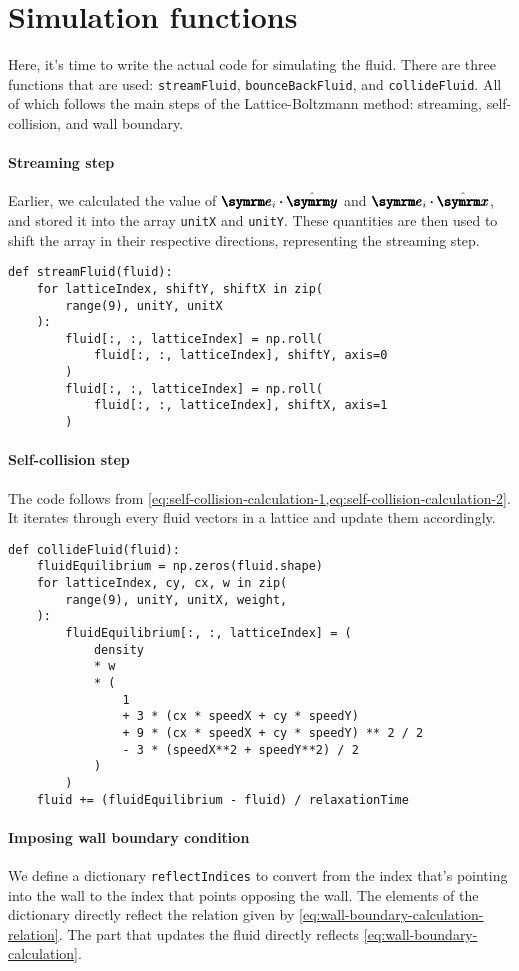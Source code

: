 \section{Simulation functions}
\label{sec:simulation-function}

Here, it's time to write the actual code for simulating the fluid. There are three functions that are used: \texttt{streamFluid}, \texttt{bounceBackFluid}, and \texttt{collideFluid}. All of which follows the main steps of the Lattice-Boltzmann method: streaming, self-collision, and wall boundary.

\paragraph{Streaming step} Earlier, we calculated the value of $\vv{e}_i\vdot\yhat$ and $\vv{e}_i\vdot\xhat$, and stored it into the array \texttt{unitX} and \texttt{unitY}. These quantities are then used to shift the array in their respective directions, representing the streaming step.
\begin{verbatim}
def streamFluid(fluid):
    for latticeIndex, shiftY, shiftX in zip(
        range(9), unitY, unitX
    ):
        fluid[:, :, latticeIndex] = np.roll(
            fluid[:, :, latticeIndex], shiftY, axis=0
        )
        fluid[:, :, latticeIndex] = np.roll(
            fluid[:, :, latticeIndex], shiftX, axis=1
        )
\end{verbatim}

\paragraph{Self-collision step} The code follows from \cref{eq:self-collision-calculation-1,eq:self-collision-calculation-2}. It iterates through every fluid vectors in a lattice and update them accordingly.
\begin{verbatim}
def collideFluid(fluid):
    fluidEquilibrium = np.zeros(fluid.shape)
    for latticeIndex, cy, cx, w in zip(
        range(9), unitY, unitX, weight,
    ):
        fluidEquilibrium[:, :, latticeIndex] = (
            density
            * w
            * (
                1
                + 3 * (cx * speedX + cy * speedY)
                + 9 * (cx * speedX + cy * speedY) ** 2 / 2
                - 3 * (speedX**2 + speedY**2) / 2
            )
        )
    fluid += (fluidEquilibrium - fluid) / relaxationTime
\end{verbatim}

\paragraph{Imposing wall boundary condition} We define a dictionary \texttt{reflectIndices} to convert from the index that's pointing into the wall to the index that points opposing the wall. The elements of the dictionary directly reflect the relation given by \cref{eq:wall-boundary-calculation-relation}. The part that updates the fluid directly reflects \cref{eq:wall-boundary-calculation}.

